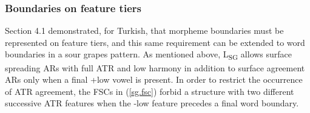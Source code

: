 \documentclass[,doc,floatsintext]{apa6}
\theoremstyle{definition}
\theoremstyle{definition}
\theoremstyle{definition}
\theoremstyle{remark}
\begin{document}
\subsubsection{Boundaries on feature
tiers}\label{boundaries-on-feature-tiers}

Section 4.1 demonstrated, for Turkish, that morpheme boundaries must be
represented on feature tiers, and this same requirement can be extended
to word boundaries in a sour grapes pattern. As mentioned above,
L\textsubscript{SG} allows surface spreading ARs with full ATR and low
harmony in addition to surface agreement ARs only when a final +low
vowel is present. In order to restrict the occurrence of ATR agreement,
the FSCs in (\ref{sg.fsc}) forbid a structure with two different
successive ATR features when the -low feature precedes a final word
boundary.
\end{document}
